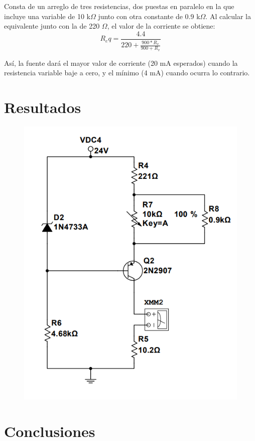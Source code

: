 \documentclass{article}
\begin{document}
Consta de un arreglo de tres resistencias, dos puestas en paralelo en la que incluye una variable de 10 k\(\Omega\) junto con
otra constante de 0.9 k\(\Omega\). Al calcular la equivalente junto con la de 220 \(\Omega\), el valor de la corriente se obtiene:
\[ R_eq = \frac{4.4}{220 + \frac{900*R_v}{900 + R_v}} \]

Así, la fuente dará el mayor valor de corriente (20 mA esperados) cuando la resistencia variable baje a cero, y el mínimo (4 mA)
cuando ocurra lo contrario.

\section{Resultados}

\begin{figure}[h]
    \centering
    \includegraphics[scale=0.6]{casoB.png}
    \label{Desarrollo del ejercicios}
\end{figure}

\section{Conclusiones}
\end{document}
